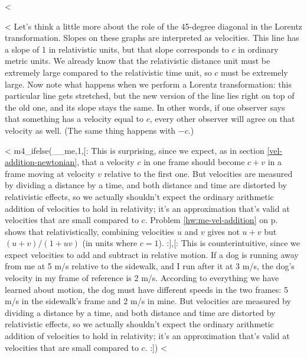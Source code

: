   <%

  <%
Let's think a little more about the role of the 45-degree diagonal in the Lorentz transformation.
Slopes on these graphs are interpreted as velocities.
This line has a slope of 1 in relativistic units, but that slope corresponds to $c$ in ordinary metric units.
We already know that the relativistic distance unit must
be extremely large compared to the relativistic time unit, so $c$ must be extremely large.
Now note what happens when we perform a Lorentz transformation: this particular line gets stretched, but the new version
of the line lies right on top of the old one, and its slope stays the
same. In other words, if one observer says  that something has a velocity equal to $c$, every other observer will agree
on that velocity as well. (The same thing happens with $-c$.) 

    <%
m4_ifelse(__me,1,[: %
This is surprising, since we expect, as in section \ref{vel-addition-newtonian}, that a velocity $c$
in one frame should become $c+v$ in a frame moving at velocity $v$ relative to the first one.
But velocities are measured by dividing a distance by a time, and
both distance and time are distorted by relativistic effects, so we actually shouldn't expect the ordinary
arithmetic addition of velocities to hold in relativity; it's an approximation that's valid at velocities
that are small compared to $c$. Problem \ref{hw:me-vel-addition} on p.~\pageref{hw:me-vel-addition} shows that
relativistically, combining velocities $u$ and $v$ gives not $u+v$ but $(u+v)/(1+uv)$ (in units where $c=1$).\label{me-vel-addition-main-text}
:],[: %
This is counterintuitive, since we expect velocities to
add and subtract in relative motion. If a dog is running away from me at
5 m/s relative to the sidewalk, and I run after it at 3 m/s,
the dog's velocity in my frame of reference is 2 m/s.
According to everything we have learned about motion, the
dog must have different speeds in the two frames: 5 m/s in
the sidewalk's frame and 2 m/s in mine. But velocities are measured by dividing a distance by a time, and
both distance and time are distorted by relativistic effects, so we actually shouldn't expect the ordinary
arithmetic addition of velocities to hold in relativity; it's an approximation that's valid at velocities
that are small compared to $c$.
:])
    <%


